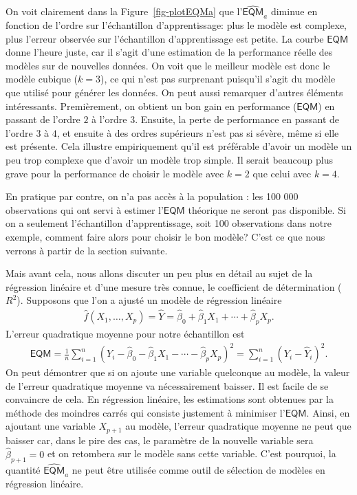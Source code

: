 \documentclass[
  11pt,
  letterpaper,
]{scrbook}
\theoremstyle{definition}
\theoremstyle{remark}
\begin{document}
On voit clairement dans la Figure~\ref{fig-plotEQMa} que
l'\(\widehat{\mathsf{EQM}}_a\) diminue en fonction de l'ordre sur
l'échantillon d'apprentissage: plus le modèle est complexe, plus
l'erreur observée sur l'échantillon d'apprentissage est petite. La
courbe \(\mathsf{EQM}\) donne l'heure juste, car il s'agit d'une
estimation de la performance réelle des modèles sur de nouvelles
données. On voit que le meilleur modèle est donc le modèle cubique
(\(k=3\)), ce qui n'est pas surprenant puisqu'il s'agit du modèle que
utilisé pour générer les données. On peut aussi remarquer d'autres
éléments intéressants. Premièrement, on obtient un bon gain en
performance (\(\mathsf{EQM}\)) en passant de l'ordre \(2\) à l'ordre
\(3\). Ensuite, la perte de performance en passant de l'ordre \(3\) à
\(4\), et ensuite à des ordres supérieurs n'est pas si sévère, même si
elle est présente. Cela illustre empiriquement qu'il est préférable
d'avoir un modèle un peu trop complexe que d'avoir un modèle trop
simple. Il serait beaucoup plus grave pour la performance de choisir le
modèle avec \(k=2\) que celui avec \(k=4\).

En pratique par contre, on n'a pas accès à la population : les 100 000
observations qui ont servi à estimer l'\(\mathsf{EQM}\) théorique ne
seront pas disponible. Si on a seulement l'échantillon d'apprentissage,
soit 100 observations dans notre exemple, comment faire alors pour
choisir le bon modèle? C'est ce que nous verrons à partir de la section
suivante.

Mais avant cela, nous allons discuter un peu plus en détail au sujet de
la régression linéaire et d'une mesure très connue, le coefficient de
détermination (\(R^2\)). Supposons que l'on a ajusté un modèle de
régression linéaire \begin{align*}
\widehat{f}(X_1, \ldots, X_p) = \widehat{Y}=\widehat{\beta}_0 + \widehat{\beta}_1X_1+ \cdots + \widehat{\beta}_p X_p.
\end{align*} L'erreur quadratique moyenne pour notre échantillon est
\begin{align*}
\mathsf{EQM}=\frac{1}{n}\sum_{i=1}^n (Y_i - \widehat{\beta}_0 - \widehat{\beta}_1X_1 - \cdots - \widehat{\beta}_p X_p)^2 = \sum_{i=1}^n (Y_i-\widehat{Y}_i)^2.
 \end{align*} On peut démontrer que si on ajoute une variable quelconque
au modèle, la valeur de l'erreur quadratique moyenne va nécessairement
baisser. Il est facile de se convaincre de cela. En régression linéaire,
les estimations sont obtenues par la méthode des moindres carrés qui
consiste justement à minimiser l'\(\mathsf{EQM}\). Ainsi, en ajoutant
une variable \(X_{p+1}\) au modèle, l'erreur quadratique moyenne ne peut
que baisser car, dans le pire des cas, le paramètre de la nouvelle
variable sera \(\widehat{\beta}_{p+1}=0\) et on retombera sur le modèle
sans cette variable. C'est pourquoi, la quantité
\(\widehat{\mathsf{EQM}}_a\) ne peut être utilisée comme outil de
sélection de modèles en régression linéaire.
\end{document}
